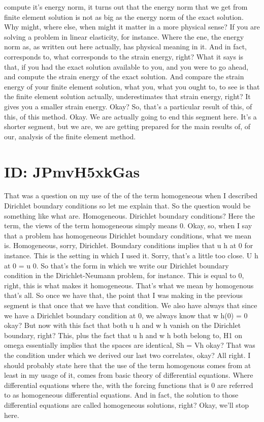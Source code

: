 \documentclass[10pt]{article}
\begin{document}
{compute it's energy norm, it turns out that the energy norm that we get from finite element solution is not as big as the energy norm of the exact solution. Why might, where else, when might it matter in a more physical sense? If you are solving a problem in linear elasticity, for instance. Where the ene, the energy norm as, as written out here actually, has physical meaning in it. And in fact, corresponds to, what corresponds to the strain energy, right? What it says is that, if you had the exact solution available to you, and you were to go ahead, and compute the strain energy of the exact solution. And compare the strain energy of your finite element solution, what you, what you ought to, to see is that the finite element solution actually, underestimates that strain energy, right? It gives you a smaller strain energy. Okay? So, that's a particular result of this, of this, of this method. Okay. We are actually going to end this segment here. It's a shorter segment, but we are, we are getting prepared for the main results of, of our, analysis of the finite element method.

\section*{ID: JPmvH5xkGas}
That was a question on my use of the of the term homogeneous when I described Dirichlet boundary conditions so let me explain that. So the question would be something like what are. Homogeneous. Dirichlet boundary conditions? Here the term, the views of the term homogeneous simply means 0. Okay, so, when I say that a problem has homogeneous Dirichlet boundary conditions, what we mean is. Homogeneous, sorry, Dirichlet. Boundary conditions implies that u h at 0 for instance. This is the setting in which I used it. Sorry, that's a little too close. U h at 0 = u 0. So that's the form in which we write our Dirichlet boundary condition in the Dirichlet-Neumann problem, for instance. This is equal to 0, right, this is what makes it homogeneous. That's what we mean by homogenous that's all. So once we have that, the point that I was making in the previous segment is that once that we have that condition. We also have always that since we have a Dirichlet boundary condition at 0, we always know that w h(0) = 0 okay? But now with this fact that both u h and w h vanish on the Dirichlet boundary, right? This, plus the fact that u h and w h both belong to, H1 on omega essentially implies that the spaces are identical, Sh = Vh okay? That was the condition under which we derived our last two correlates, okay? All right. I should probably state here that the use of the term homogenous comes from at least in my usage of it, comes from basic theory of differential equations. Where differential equations where the, with the forcing functions that is 0 are referred to as homogeneous differential equations. And in fact, the solution to those differential equations are called homogeneous solutions, right? Okay, we'll stop here.

}
\end{document}
